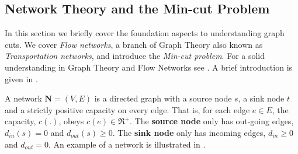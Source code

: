\subsection{Network Theory and the Min-cut Problem}
\label{sec:NetworkTheory}

In this section we briefly cover the foundation aspects to understanding graph cuts. We cover \textit{Flow networks}, a branch of Graph Theory also known as \textit{Transportation networks}, and introduce the \textit{Min-cut problem}. For a solid understanding in Graph Theory and Flow Networks see \citep{Deo1974,Bondy1976,Steen2010,Newman2010}. A brief introduction is given in .

\begin{definition}[Network]
	A network $\textbf{N} = (V,E)$ is a directed graph with a source node $s$, a sink node $t$ and a strictly positive capacity on every edge. That is, for each edge $e \in E$, the capacity, $c(.)$, obeys $c(e) \in \Re^{+}$.
	The \textbf{source node} only has out-going edges, $d_{in}(s) = 0$ and $d_{out}(s) \geq 0$. The \textbf{sink node} only has incoming edges, $d_{in} \geq 0$ and $d_{out} = 0$. An example of a network is illustrated in .
\end{definition}

